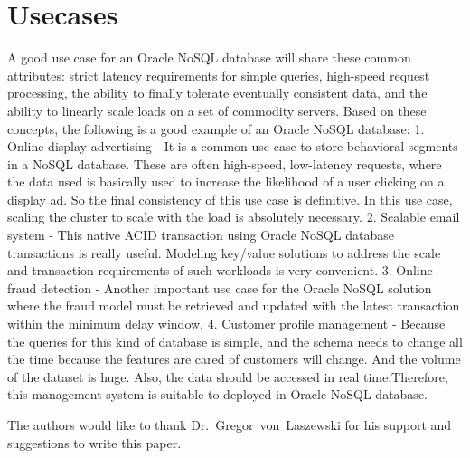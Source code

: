 \section{Usecases}
A good use case for an Oracle NoSQL database will share these common attributes: strict latency requirements for simple queries, high-speed request processing, the ability to finally tolerate eventually consistent data, and the ability to linearly scale loads on a set of commodity servers. Based on these concepts, the following is a good example of an Oracle NoSQL database:
1. Online display advertising - It is a common use case to store behavioral segments in a NoSQL database. These are often high-speed, low-latency requests, where the data used is basically used to increase the likelihood of a user clicking on a display ad. So the final consistency of this use case is definitive. In this use case, scaling the cluster to scale with the load is absolutely necessary.
2. Scalable email system - This native ACID transaction using Oracle NoSQL database transactions is really useful. Modeling key/value solutions to address the scale and transaction requirements of such workloads is very convenient.
3. Online fraud detection - Another important use case for the Oracle NoSQL solution where the fraud model must be retrieved and updated with the latest transaction within the minimum delay window.
4. Customer profile management - Because the queries for this kind of database is simple, and the schema needs to change all the time because the features are cared of customers will change. And the volume of the dataset is huge. Also, the data should be accessed in real time.Therefore, this management system is suitable to deployed in Oracle NoSQL database. 


\begin{acks}

  The authors would like to thank Dr.~Gregor~von~Laszewski for his
  support and suggestions to write this paper.

\end{acks}


 

